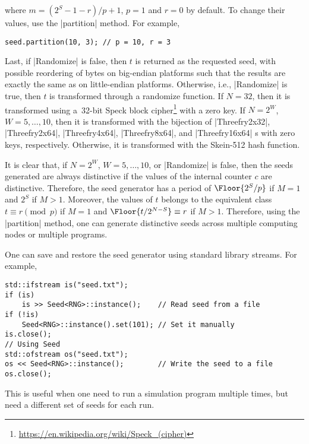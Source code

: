 where $m = (2^S - 1 - r) / p + 1$, $p = 1$ and $r = 0$ by default. To change
their values, use the |partition| method. For example,
\begin{verbatim}
seed.partition(10, 3); // p = 10, r = 3
\end{verbatim}
Last, if |Randomize| is false, then $t$ is returned as the requested seed, with
possible reordering of bytes on big-endian platforms such that the results are
exactly the same as on little-endian platforms. Otherwise, i.e., |Randomize| is
true, then $t$ is transformed through a randomize function. If $N = 32$, then
it is transformed using a~32-bit Speck block
cipher\footnote{\url{https://en.wikipedia.org/wiki/Speck_(cipher)}} with a zero
key. If $N = 2^W$, $W = 5,\dots,10$, then it is transformed with the bijection
of |Threefry2x32|, |Threefry2x64|, |Threefry4x64|, |Threefry8x64|, and
|Threefry16x64| \rng{}s with zero keys, respectively. Otherwise, it is
transformed with the Skein-512 hash function.

It is clear that, if $N = 2^W$, $W = 5,\dots,10$, or |Randomize| is false, then
the seeds generated are always distinctive if the values of the internal
counter $c$ are distinctive. Therefore, the seed generator has a period of
$\Floor{2^S / p}$ if $M = 1$ and $2^S$ if $M > 1$. Moreover, the values of $t$
belongs to the equivalent class $t \equiv r \pmod{p}$ if $M = 1$ and $\Floor{t
/ 2^{N - S}} \equiv r$ if $M > 1$. Therefore, using the |partition| method, one
can generate distinctive seeds across multiple computing nodes or multiple
programs.

One can save and restore the seed generator using standard library streams. For
example,
\begin{verbatim}
std::ifstream is("seed.txt");
if (is)
    is >> Seed<RNG>::instance();    // Read seed from a file
if (!is)
    Seed<RNG>::instance().set(101); // Set it manually
is.close();
// Using Seed
std::ofstream os("seed.txt");
os << Seed<RNG>::instance();        // Write the seed to a file
os.close();
\end{verbatim}
This is useful when one need to run a simulation program multiple times, but
need a different set of seeds for each run.

